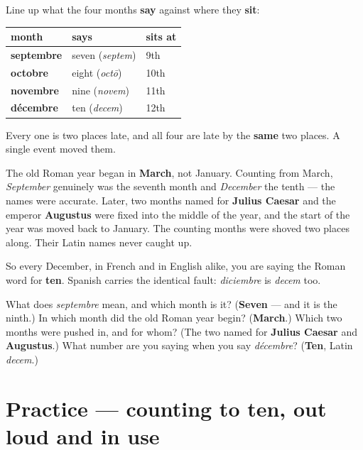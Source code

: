 \begin{cousinweb}
Line up what the four months \textbf{say} against where they \textbf{sit}:

\noindent
\begin{tabularx}{\linewidth}{@{}>{\raggedright\arraybackslash}X>{\raggedright\arraybackslash}X>{\raggedright\arraybackslash}X@{}}
\toprule
\textbf{month} & \textbf{says} & \textbf{sits at} \\
\midrule
\textbf{septembre} & seven (\emph{septem}) & 9th \\
\textbf{octobre} & eight (\emph{octō}) & 10th \\
\textbf{novembre} & nine (\emph{novem}) & 11th \\
\textbf{décembre} & ten (\emph{decem}) & 12th \\
\bottomrule
\end{tabularx}

Every one is two places late, and all four are late by the \textbf{same} two places. A single event moved them.

The old Roman year began in \textbf{March}, not January. Counting from March, \emph{September} genuinely was the seventh month and \emph{December} the tenth — the names were accurate. Later, two months named for \textbf{Julius Caesar} and the emperor \textbf{Augustus} were fixed into the middle of the year, and the start of the year was moved back to January. The counting months were shoved two places along. Their Latin names never caught up.

So every December, in French and in English alike, you are saying the Roman word for \textbf{ten}. Spanish carries the identical fault: \emph{diciembre} is \emph{decem} too.
\end{cousinweb}

\begin{tcolorbox}[breakable,colback=teal!4,colframe=teal!35!black,title={Before you move on}]
What does \emph{septembre} mean, and which month is it? (\textbf{Seven} — and it is the ninth.) In which month did the old Roman year begin? (\textbf{March}.) Which two months were pushed in, and for whom? (The two named for \textbf{Julius Caesar} and \textbf{Augustus}.) What number are you saying when you say \emph{décembre}? (\textbf{Ten}, Latin \emph{decem}.)
\end{tcolorbox}
\section[Practice]{Practice — counting to ten, out loud and in use}

